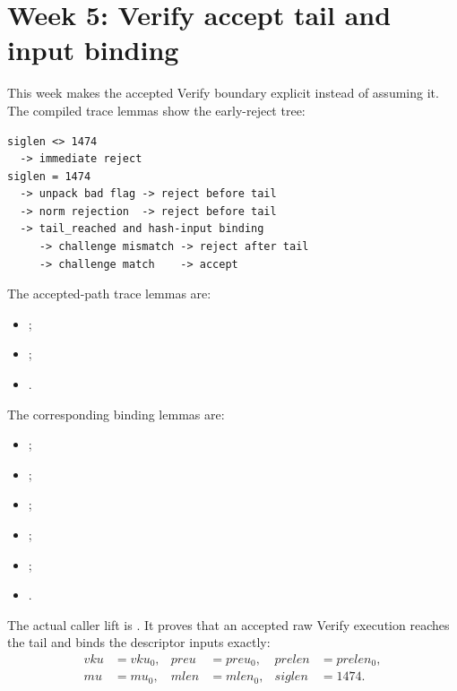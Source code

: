 \section{Week 5: Verify accept tail and input binding}

This week makes the accepted Verify boundary explicit instead of assuming it.
The compiled trace lemmas show the early-reject tree:

\begin{verbatim}
siglen <> 1474
  -> immediate reject
siglen = 1474
  -> unpack bad flag -> reject before tail
  -> norm rejection  -> reject before tail
  -> tail_reached and hash-input binding
     -> challenge mismatch -> reject after tail
     -> challenge match    -> accept
\end{verbatim}

The accepted-path trace lemmas are:
\begin{itemize}
  \item {};
  \item {};
  \item {}.
\end{itemize}

The corresponding binding lemmas are:
\begin{itemize}
  \item {};
  \item {};
  \item {};
  \item {};
  \item {};
  \item {}.
\end{itemize}

The actual caller lift is
.
It proves that an accepted raw Verify execution reaches the tail and binds the
descriptor inputs exactly:
\[
\begin{aligned}
  vku &= vku_0, & preu &= preu_0, & prelen &= prelen_0,\\
  mu  &= mu_0,  & mlen &= mlen_0, & siglen &= 1474.
\end{aligned}
\]

